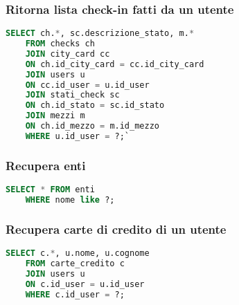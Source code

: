 \subsubsection{Ritorna lista check-in fatti da un utente}
\begin{lstlisting}[language=SQL]
	SELECT ch.*, sc.descrizione_stato, m.*
	FROM checks ch
	JOIN city_card cc
	ON ch.id_city_card = cc.id_city_card
	JOIN users u
	ON cc.id_user = u.id_user
	JOIN stati_check sc
	ON ch.id_stato = sc.id_stato
	JOIN mezzi m
	ON ch.id_mezzo = m.id_mezzo
	WHERE u.id_user = ?;`
\end{lstlisting}


\subsubsection{Recupera enti}
\begin{lstlisting}[language=SQL]
	SELECT * FROM enti
	WHERE nome like ?;
\end{lstlisting}




\subsubsection{Recupera carte di credito di un utente}
\begin{lstlisting}[language=SQL]
	SELECT c.*, u.nome, u.cognome
	FROM carte_credito c
	JOIN users u
	ON c.id_user = u.id_user
	WHERE c.id_user = ?;
\end{lstlisting}


